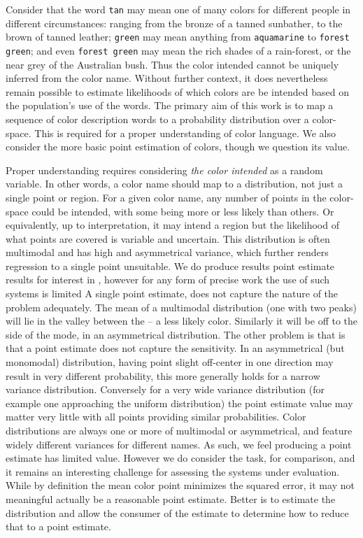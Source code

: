 \documentclass[11pt,a4paper]{article}
\begin{document}
Consider that the word \texttt{tan} may mean one of many colors for different people in different circumstances: ranging from the bronze of a tanned sunbather, to the brown of tanned leather;
\texttt{green} may mean anything from \texttt{aquamarine} to \texttt{forest green};
and even \texttt{forest green} may mean the rich shades of a rain-forest, or the near grey of the Australian bush.
Thus the color intended cannot be uniquely inferred from the color name.
Without further context, it does nevertheless remain possible to estimate likelihoods of which colors are be intended based on the population's use of the words.
The primary aim of this work is to map a sequence of color description words to a probability distribution over a color-space.
This is required for a proper understanding of color language.
We also consider the more basic point estimation of colors, though we question its value.


Proper understanding requires considering \emph{the color intended} as a random variable.
In other words, a color name should map to a distribution, not just a single point or region.
For a given color name, any number of points in the color-space could be intended, with some being more or less likely than others.
Or equivalently, up to interpretation, it may intend a region but the likelihood of what points are covered is variable and uncertain.
This distribution is often multimodal and has high and asymmetrical variance, which further renders regression to a single point unsuitable.
We do produce results point estimate results for interest in , however for any form of precise work the use of such systems is limited
A single point estimate, does not capture the nature of the problem adequately.
The mean of a multimodal distribution (one with two peaks) will lie in the valley between the -- a less likely color.
Similarly it will be off to the side of the mode, in an asymmetrical distribution.
The other problem is that is that a point estimate does not capture the sensitivity.
In an asymmetrical (but monomodal) distribution, having  point slight off-center in one direction may result in very different probability,
this more generally holds for a narrow variance distribution.
Conversely for a very wide variance distribution (for example one approaching the uniform distribution) the point estimate value may matter very little with all points providing similar probabilities.
Color distributions are always one or more of multimodal or asymmetrical, and feature widely different variances for different names.
As such, we feel producing a point estimate has limited value.
However we do consider the task, for comparison, and it remains an interesting challenge for assessing the systems under evaluation.
While by definition the mean color point minimizes the squared error, it may not meaningful actually be a reasonable point estimate.
Better is to estimate the distribution and allow the consumer of the estimate to determine how to reduce that to a point estimate.
\end{document}
